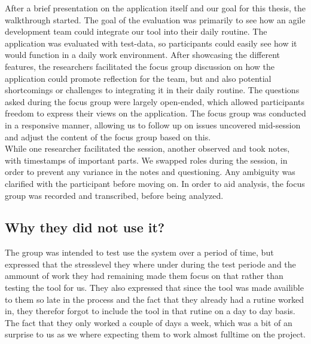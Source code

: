 After a brief presentation on the application itself and our goal for this thesis, the walkthrough started. The goal of the evaluation was primarily to see how an agile development team could integrate our tool into their daily routine. The application was evaluated with test-data, so participants could easily see how it would function in a daily work environment. After showcasing the different features, the researchers facilitated the focus group discussion on how the application could promote reflection for the team, but and also potential shortcomings or challenges to integrating it in their daily routine. The questions asked during the focus group were largely open-ended, which allowed participants freedom to express their views on the application\cite{yin2008case}. The focus group was conducted in a responsive manner, allowing us to follow up on issues uncovered mid-session and adjust the content of the focus group based on this\cite{rubin2011qualitative, wengraf2001qualitative}.\\
While one researcher facilitated the session, another observed and took notes, with timestamps of important parts. We swapped roles during the session, in order to prevent any variance in the notes and questioning. Any ambiguity was clarified with the participant before moving on. In order to aid analysis, the focus group was recorded and transcribed, before being analyzed. 

\subsection{Why they did not use it?}
The group was intended to test use the system over a period of time, but expressed that the stresslevel they where under during the test periode and the ammount of work they had remaining made them focus on that rather than testing the tool for us. They also expressed that since the tool was made availible to them so late in the process and the fact that they already had a rutine worked in, they therefor forgot to include the tool in that rutine on a day to day basis. The fact that they only worked a couple of days a week, which was a bit of an surprise to us as we where expecting them to work almost fulltime on the project.

